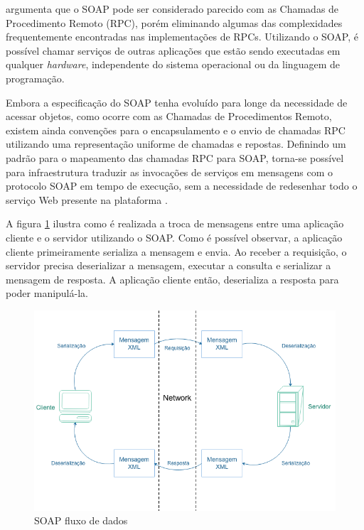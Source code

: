  argumenta que o SOAP pode ser considerado parecido com as Chamadas de Procedimento Remoto (RPC), porém eliminando algumas das complexidades frequentemente encontradas nas implementações de RPCs. Utilizando o SOAP, é possível chamar serviços de outras aplicações que estão sendo executadas em qualquer \textit{hardware}, independente do sistema operacional ou da linguagem de programação.

Embora a especificação do SOAP tenha evoluído para longe da necessidade de acessar objetos, como ocorre com as Chamadas de Procedimentos Remoto, existem ainda convenções para o encapsulamento e o envio de chamadas RPC utilizando uma representação uniforme de chamadas e repostas. Definindo um padrão para o mapeamento das chamadas RPC para SOAP, torna-se possível para infraestrutura traduzir as invocações de serviços em mensagens com o protocolo SOAP em tempo de execução, sem a necessidade de redesenhar todo o serviço Web presente na plataforma \cite{soap-microsoft}.

A figura \ref{fig:soap} ilustra como é realizada a troca de mensagens entre uma aplicação cliente e o servidor utilizando o SOAP. Como é possível observar, a aplicação cliente primeiramente serializa a mensagem e envia. Ao receber a requisição, o servidor precisa deserializar a mensagem, executar a consulta e serializar a mensagem de resposta. A aplicação cliente então, deserializa a resposta para poder manipulá-la.

\begin{figure}[htbp]
\centering
\includegraphics[width=1\textwidth]{figuras/soap.png}
\caption{SOAP fluxo de dados}
\label{fig:soap}
\author{https://msdn.microsoft.com/en-us/library/x05s00wz(v=vs.80).aspx}
\end{figure}

